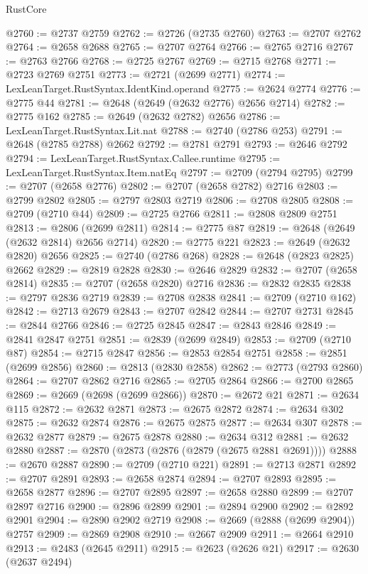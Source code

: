 \begin{lexlean}{RustCore}
\begin{coremodule}
@2760 := @2737 @2759
@2762 := @2726 (@2735 @2760)
@2763 := @2707 @2762
@2764 := @2658 @2688
@2765 := @2707 @2764
@2766 := @2765 @2716
@2767 := @2763 @2766
@2768 := @2725 @2767
@2769 := @2715 @2768
@2771 := @2723 @2769 @2751
@2773 := @2721 (@2699 @2771)
@2774 := LexLeanTarget.RustSyntax.IdentKind.operand
@2775 := @2624 @2774
@2776 := @2775 @44
@2781 := @2648 (@2649 (@2632 @2776) @2656 @2714)
@2782 := @2775 @162
@2785 := @2649 (@2632 @2782) @2656
@2786 := LexLeanTarget.RustSyntax.Lit.nat
@2788 := @2740 (@2786 @253)
@2791 := @2648 (@2785 @2788) @2662
@2792 := @2781 @2791
@2793 := @2646 @2792
@2794 := LexLeanTarget.RustSyntax.Callee.runtime
@2795 := LexLeanTarget.RustSyntax.Item.natEq
@2797 := @2709 (@2794 @2795)
@2799 := @2707 (@2658 @2776)
@2802 := @2707 (@2658 @2782) @2716
@2803 := @2799 @2802
@2805 := @2797 @2803 @2719
@2806 := @2708 @2805
@2808 := @2709 (@2710 @44)
@2809 := @2725 @2766
@2811 := @2808 @2809 @2751
@2813 := @2806 (@2699 @2811)
@2814 := @2775 @87
@2819 := @2648 (@2649 (@2632 @2814) @2656 @2714)
@2820 := @2775 @221
@2823 := @2649 (@2632 @2820) @2656
@2825 := @2740 (@2786 @268)
@2828 := @2648 (@2823 @2825) @2662
@2829 := @2819 @2828
@2830 := @2646 @2829
@2832 := @2707 (@2658 @2814)
@2835 := @2707 (@2658 @2820) @2716
@2836 := @2832 @2835
@2838 := @2797 @2836 @2719
@2839 := @2708 @2838
@2841 := @2709 (@2710 @162)
@2842 := @2713 @2679
@2843 := @2707 @2842
@2844 := @2707 @2731
@2845 := @2844 @2766
@2846 := @2725 @2845
@2847 := @2843 @2846
@2849 := @2841 @2847 @2751
@2851 := @2839 (@2699 @2849)
@2853 := @2709 (@2710 @87)
@2854 := @2715 @2847
@2856 := @2853 @2854 @2751
@2858 := @2851 (@2699 @2856)
@2860 := @2813 (@2830 @2858)
@2862 := @2773 (@2793 @2860)
@2864 := @2707 @2862 @2716
@2865 := @2705 @2864
@2866 := @2700 @2865
@2869 := @2669 (@2698 (@2699 @2866))
@2870 := @2672 @21
@2871 := @2634 @115
@2872 := @2632 @2871
@2873 := @2675 @2872
@2874 := @2634 @302
@2875 := @2632 @2874
@2876 := @2675 @2875
@2877 := @2634 @307
@2878 := @2632 @2877
@2879 := @2675 @2878
@2880 := @2634 @312
@2881 := @2632 @2880
@2887 := @2870 (@2873 (@2876 (@2879 (@2675 @2881 @2691))))
@2888 := @2670 @2887
@2890 := @2709 (@2710 @221)
@2891 := @2713 @2871
@2892 := @2707 @2891
@2893 := @2658 @2874
@2894 := @2707 @2893
@2895 := @2658 @2877
@2896 := @2707 @2895
@2897 := @2658 @2880
@2899 := @2707 @2897 @2716
@2900 := @2896 @2899
@2901 := @2894 @2900
@2902 := @2892 @2901
@2904 := @2890 @2902 @2719
@2908 := @2669 (@2888 (@2699 @2904)) @2757
@2909 := @2869 @2908
@2910 := @2667 @2909
@2911 := @2664 @2910
@2913 := @2483 (@2645 @2911)
@2915 := @2623 (@2626 @21)
@2917 := @2630 (@2637 @2494)

\end{coremodule}
\end{lexlean}
